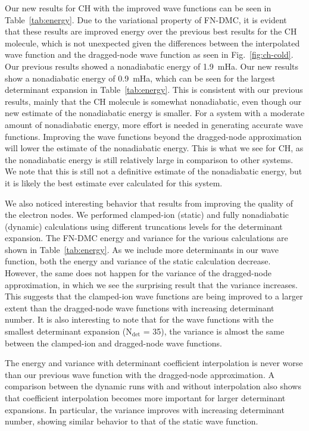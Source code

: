 \documentclass[aip,jcp,numerical,reprint]{revtex4-1}
\begin{document}
Our new results for CH with the improved wave functions can be seen in Table~\ref{tab:energy}.  Due to the variational property of FN-DMC, it is evident that these results are improved energy over the previous best results for the CH molecule, which is not unexpected given the differences between the interpolated wave function and the dragged-node wave function as seen in Fig.~\ref{fig:ch-cold}. Our previous results showed a nonadiabatic energy of 1.9~mHa. Our new results show a nonadiabatic energy of 0.9~mHa, which can be seen for the largest determinant expansion in Table~\ref{tab:energy}.  This is consistent with our previous results, mainly that the CH molecule is somewhat nonadiabatic, even though our new estimate of the nonadiabatic energy is smaller.  For a system with a moderate amount of nonadiabatic energy, more effort is needed in generating accurate wave functions.  Improving the wave functions beyond the dragged-node approximation will lower the estimate of the nonadiabatic energy. This is what we see for CH, as the nonadiabatic energy is still  relatively large in comparison to other systems.  We note that this is still not a definitive estimate of the nonadiabatic energy, but it is likely the best estimate ever calculated for this system.

We also noticed interesting behavior that results from improving the quality of the electron nodes.  We performed clamped-ion (static) and fully nonadiabatic (dynamic) calculations using different truncations levels for the determinant expansion. The FN-DMC energy and variance for the various calculations are shown in Table~\ref{tab:energy}. As we include more determinants in our wave function, both the energy and variance of the static calculation decrease. %
However, the same does not happen for the variance of the dragged-node approximation, in which we see the surprising result that the variance increases.  This suggests that the clamped-ion wave functions are being improved to a larger extent than the dragged-node wave functions with increasing determinant number.  It is also interesting to note that for the wave functions with the smallest determinant expansion (N$_{\text{det}}$ = 35),  the variance is almost the same between the clamped-ion and dragged-node wave functions. 

The energy and variance with determinant coefficient interpolation is never worse than our previous wave function with the dragged-node approximation.  A comparison between the dynamic runs with and without interpolation also shows that coefficient interpolation becomes more important for larger determinant expansions.  In particular, the variance improves with increasing determinant number, showing similar behavior to that of the static wave function.   
\end{document}
